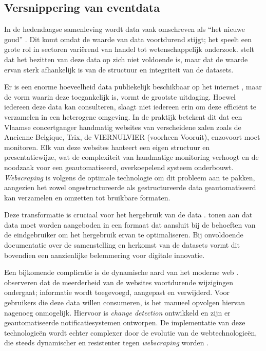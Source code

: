 \subsection{Versnippering van eventdata}

In de hedendaagse samenleving wordt data vaak omschreven als ``het nieuwe goud'' \autocite{Tseriotis2025}. 
Dit komt omdat de waarde van data voortdurend stijgt; het speelt een grote rol in sectoren variërend van handel tot wetenschappelijk onderzoek. 
\textcite{Tseriotis2025} stelt dat het bezitten van deze data op zich niet voldoende is, maar dat de waarde ervan sterk afhankelijk is van de structuur en integriteit van de datasets.

Er is een enorme hoeveelheid data publiekelijk beschikbaar op het internet \autocite{Vording2020}, maar de vorm waarin deze toegankelijk is, vormt de grootste uitdaging. 
Hoewel iedereen deze data kan consulteren, slaagt niet iedereen erin om deze efficiënt te verzamelen in een heterogene omgeving. In de praktijk betekent dit dat een Vlaamse concertganger handmatig websites van verscheidene zalen zoals de Ancienne Belgique, Trix, de VIERNULVIER (voorheen Vooruit), enzovoort moet monitoren. 
Elk van deze websites hanteert een eigen structuur en presentatiewijze, wat de complexiteit van handmatige monitoring verhoogt en de noodzaak voor een geautomatiseerd, overkoepelend systeem onderbouwt.
\textit{Webscraping} is volgens \textcite{Vording2020} de optimale technologie om dit probleem aan te pakken, aangezien het zowel ongestructureerde als gestructureerde data geautomatiseerd kan verzamelen en omzetten tot bruikbare formaten.

Deze transformatie is cruciaal voor het hergebruik van de data \autocite{Rutten2018}. 
\textcite{Rutten2018} tonen aan dat data moet worden aangeboden in een formaat dat aansluit bij de behoeften van de eindgebruiker om het hergebruik ervan te optimaliseren. 
Bij onvoldoende documentatie over de samenstelling en herkomst van de datasets vormt dit bovendien een aanzienlijke belemmering voor digitale innovatie.

Een bijkomende complicatie is de dynamische aard van het moderne web \autocite{ChangeSurvey2019}. 
\textcite{ChangeSurvey2019} observeren dat de meerderheid van de websites voortdurende wijzigingen ondergaat; informatie wordt toegevoegd, aangepast en verwijderd. 
Voor gebruikers die deze data willen consumeren, is het manueel opvolgen hiervan nagenoeg onmogelijk. 
Hiervoor is \textit{change detection} ontwikkeld en zijn er geautomatiseerde notificatiesystemen ontworpen. 
De implementatie van deze technologieën wordt echter complexer door de evolutie van de webtechnologieën, die steeds dynamischer en resistenter tegen \textit{webscraping} worden \autocite{Tseriotis2025}.

